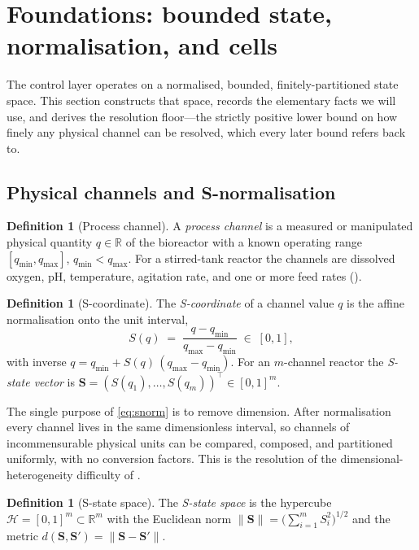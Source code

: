 \documentclass[11pt,a4paper,twocolumn]{article}
\theoremstyle{thmstyle}
\theoremstyle{definition}
\newtheorem{definition}[theorem]{Definition}
\theoremstyle{remark}
\newcommand{\R}{\mathbb{R}}
\newcommand{\Hs}{\mathcal{H}}
\newcommand{\Ss}{\mathbf{S}}
\newcommand{\norm}[1]{\lVert#1\rVert}
\begin{document}
\section{Foundations: bounded state, normalisation, and cells}
\label{sec:foundations}

The control layer operates on a normalised, bounded, finitely-partitioned
state space. This section constructs that space, records the elementary
facts we will use, and derives the resolution floor---the strictly
positive lower bound on how finely any physical channel can be resolved,
which every later bound refers back to.

\subsection{Physical channels and S-normalisation}

\begin{definition}[Process channel]
\label{def:channel}
A \emph{process channel} is a measured or manipulated physical quantity
$q\in\R$ of the bioreactor with a known operating range
$[q_{\min},q_{\max}]$, $q_{\min}<q_{\max}$. For a stirred-tank reactor the
channels are dissolved oxygen, pH, temperature, agitation rate, and one
or more feed rates ().
\end{definition}

\begin{definition}[S-coordinate]
\label{def:snorm}
The \emph{S-coordinate} of a channel value $q$ is the affine
normalisation onto the unit interval,
\begin{equation}
\label{eq:snorm}
S(q)\;=\;\frac{q-q_{\min}}{q_{\max}-q_{\min}}\;\in\;[0,1],
\end{equation}
with inverse $q=q_{\min}+S(q)\,(q_{\max}-q_{\min})$. For an $m$-channel
reactor the \emph{S-state vector} is
$\Ss=(S(q_1),\dots,S(q_m))^{\top}\in[0,1]^m$.
\end{definition}

The single purpose of \eqref{eq:snorm} is to remove dimension. After
normalisation every channel lives in the same dimensionless interval, so
channels of incommensurable physical units can be compared, composed, and
partitioned uniformly, with no conversion factors. This is the resolution
of the dimensional-heterogeneity difficulty of .

\begin{definition}[S-state space]
\label{def:hspace}
The \emph{S-state space} is the hypercube
$\Hs=[0,1]^m\subset\R^m$ with the Euclidean norm
$\norm{\Ss}=\bigl(\sum_{i=1}^m S_i^2\bigr)^{1/2}$ and the metric
$d(\Ss,\Ss')=\norm{\Ss-\Ss'}$.
\end{definition}
\end{document}
